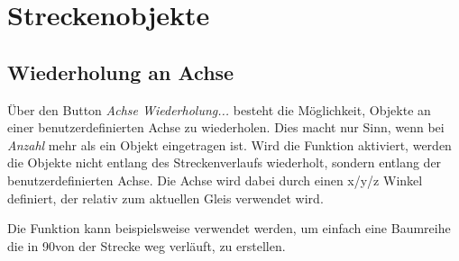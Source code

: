 \section{Streckenobjekte}

\subsection{Wiederholung an Achse}
\label{sec:editor-strecke-obj-achsewiederholung}
Über den Button \emph{Achse Wiederholung...} besteht die Möglichkeit, Objekte an einer benutzerdefinierten Achse zu wiederholen. Dies macht nur Sinn, wenn bei \emph{Anzahl} mehr als ein Objekt eingetragen ist. Wird die Funktion aktiviert, werden die Objekte nicht entlang des Streckenverlaufs wiederholt, sondern entlang der benutzerdefinierten Achse. Die Achse wird dabei durch einen x/y/z Winkel definiert, der relativ zum aktuellen Gleis verwendet wird.

Die Funktion kann beispielsweise verwendet werden, um einfach eine Baumreihe die in 90\degree von der Strecke weg verläuft, zu erstellen.
